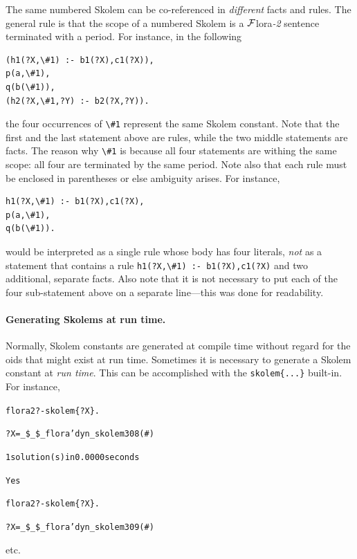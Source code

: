 \documentclass[11pt]{article}
\newcommand{\FLORA}{{\mbox{\sc ${\cal F}${lora}\rm\emph{-2}}}\xspace}
\newcommand{\FLSYSTEM}{\FLORA}
\newcommand{\FLPREFIX}{\_\$\_\$\_flora}
\newcommand{\prompt}{flora2 ?- }
\newcommand{\bs}{\textbackslash}
\begin{document}
The same numbered Skolem can be co-referenced in \emph{different} facts and
rules.  The general rule is that the scope of a numbered Skolem is a \FLSYSTEM
sentence terminated with a period. For instance, in the following
\begin{verbatim}
(h1(?X,\#1) :- b1(?X),c1(?X)),
p(a,\#1),
q(b(\#1)),
(h2(?X,\#1,?Y) :- b2(?X,?Y)).
\end{verbatim}
the four occurrences of \texttt{\bs{}\#1} represent the same Skolem constant.
Note that the first and the last statement above are rules, while the two
middle statements are facts. The reason why \texttt{\bs{}\#1} is because all
four statements are withing the same scope: all four are terminated by the
same period. Note also that each rule must be enclosed in parentheses or
else ambiguity arises. For instance,
\begin{verbatim}
h1(?X,\#1) :- b1(?X),c1(?X),
p(a,\#1),
q(b(\#1)).
\end{verbatim}
would be interpreted as a single rule whose body has four literals,
\emph{not} as a statement that contains a rule
\verb|h1(?X,\#1) :- b1(?X),c1(?X)|
and two additional, separate facts.
Also note that it is not necessary to put each of the four sub-statement above 
on a separate line---this was done for readability.

\paragraph{Generating Skolems at run time.}
Normally,
Skolem constants are generated at compile time without regard for the oids
that might exist at run time. Sometimes it is necessary to generate a
Skolem constant at \emph{run time}. This can be accomplished with the
{\tt skolem\{...\}} built-in. For instance, 
\begin{alltt}
\prompt skolem\{?X\}.
 
?X = \FLPREFIX'dyn_skolem308   (\#)
 
1 solution(s) in 0.0000 seconds 
 
Yes

\prompt skolem\{?X\}.

?X = \FLPREFIX'dyn_skolem309  (\#)
\end{alltt}
etc.
\end{document}
